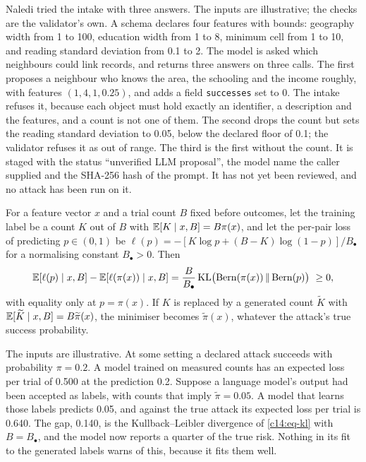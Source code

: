 \begin{example}\label{c14:ex-intake}
Naledi tried the intake with three answers. The inputs are illustrative; the checks are
the validator's own. A schema declares four features with bounds: geography width from 1
to 100, education width from 1 to 8, minimum cell from 1 to 10, and reading standard
deviation from 0.1 to 2. The model is asked which neighbours could link records, and
returns three answers on three calls. The first proposes a neighbour who knows the area,
the schooling and the income roughly, with features $(1, 4, 1, 0.25)$, and adds a field
\texttt{successes} set to 0. The intake refuses it, because each object must hold exactly
an identifier, a description and the features, and a count is not one of them. The
second drops the count but sets the reading standard deviation to 0.05, below the
declared floor of 0.1; the validator refuses it as out of range. The third is the first
without the count. It is staged with the status ``unverified LLM proposal'', the model
name the caller supplied and the SHA-256 hash of the prompt. It has not yet been
reviewed, and no attack has been run on it.
\end{example}


\begin{proposition}\label{c14:prop-labels}
For a feature vector $x$ and a trial count $B$ fixed before outcomes, let the training
label be a count $K$ out of $B$ with $\mathbb{E}[K \mid x, B] = B\pi(x)$, and let the
per-pair loss of predicting $p \in (0,1)$ be
$\ell(p) = -[K\log p + (B-K)\log(1-p)]/B_\bullet$ for a normalising constant
$B_\bullet > 0$. Then
\begin{equation}\label{c14:eq-kl}
\E[\ell(p) \mid x,B] - \E[\ell(\pi(x)) \mid x,B]
= \frac{B}{B_\bullet}\,
\mathrm{KL}\bigl(\mathrm{Bern}(\pi(x)) \,\|\, \mathrm{Bern}(p)\bigr) \ \ge 0,
\end{equation}
with equality only at $p = \pi(x)$. If $K$ is replaced by a generated count
$\widetilde K$ with $\mathbb{E}[\widetilde K \mid x,B] = B\widetilde\pi(x)$, the minimiser
becomes $\widetilde\pi(x)$, whatever the attack's true success probability.
\end{proposition}


\begin{example}\label{c14:ex-label}
The inputs are illustrative. At some setting a declared attack succeeds with probability
$\pi = 0.2$. A model trained on measured counts has an expected loss per trial of 0.500
at the prediction 0.2. Suppose a language model's output had been accepted as labels,
with counts that imply $\widetilde\pi = 0.05$. A model that learns those labels predicts
0.05, and against the true attack its expected loss per trial is 0.640. The gap, 0.140,
is the Kullback--Leibler divergence of \eqref{c14:eq-kl} with $B = B_\bullet$, and the
model now reports a quarter of the true risk. Nothing in its fit to the generated labels
warns of this, because it fits them well.
\end{example}

